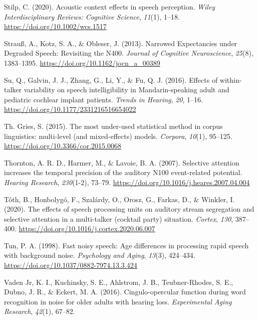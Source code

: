 \documentclass[a4paper, nobind]{templates/ociamthesis}
\newlength{\cslhangindent}
\newenvironment{CSLReferences}[2] %
 {%
  \setlength{\parindent}{0pt}
  \ifodd #1
  \let\oldpar\par
  \def\par{\hangindent=\cslhangindent\oldpar}
  \fi
  \setlength{\parskip}{1mm}
  \setlength{\baselineskip}{6mm}
 }%
 {}
\begin{document}
\begin{CSLReferences}{1}{0}
\leavevmode{}%
Stilp, C. (2020). {Acoustic context effects in speech perception}. \emph{Wiley Interdisciplinary Reviews: Cognitive Science}, \emph{11}(1), 1--18. \url{https://doi.org/10.1002/wcs.1517}

\leavevmode{}%
Strauß, A., Kotz, S. A., \& Obleser, J. (2013). Narrowed Expectancies under Degraded Speech: Revisiting the N400. \emph{Journal of Cognitive Neuroscience}, \emph{25}(8), 1383--1395. \url{https://doi.org/10.1162/jocn_a_00389}

\leavevmode{}%
Su, Q., Galvin, J. J., Zhang, G., Li, Y., \& Fu, Q. J. (2016). {Effects of within-talker variability on speech intelligibility in Mandarin-speaking adult and pediatric cochlear implant patients}. \emph{Trends in Hearing}, \emph{20}, 1--16. \url{https://doi.org/10.1177/2331216516654022}

\leavevmode{}%
Th. Gries, S. (2015). {The most under-used statistical method in corpus linguistics: multi-level (and mixed-effects) models}. \emph{Corpora}, \emph{10}(1), 95--125. \url{https://doi.org/10.3366/cor.2015.0068}

\leavevmode{}%
Thornton, A. R. D., Harmer, M., \& Lavoie, B. A. (2007). {Selective attention increases the temporal precision of the auditory N100 event-related potential}. \emph{Hearing Research}, \emph{230}(1-2), 73--79. \url{https://doi.org/10.1016/j.heares.2007.04.004}

\leavevmode{}%
Tóth, B., Honbolygó, F., Szalárdy, O., Orosz, G., Farkas, D., \& Winkler, I. (2020). {The effects of speech processing units on auditory stream segregation and selective attention in a multi-talker (cocktail party) situation}. \emph{Cortex}, \emph{130}, 387--400. \url{https://doi.org/10.1016/j.cortex.2020.06.007}

\leavevmode{}%
Tun, P. A. (1998). {Fast noisy speech: Age differences in processing rapid speech with background noise}. \emph{Psychology and Aging}, \emph{13}(3), 424--434. \url{https://doi.org/10.1037/0882-7974.13.3.424}

\leavevmode{}%
Vaden Jr, K. I., Kuchinsky, S. E., Ahlstrom, J. B., Teubner-Rhodes, S. E., Dubno, J. R., \& Eckert, M. A. (2016). Cingulo-opercular function during word recognition in noise for older adults with hearing loss. \emph{Experimental Aging Research}, \emph{42}(1), 67--82.


\end{CSLReferences}
\end{document}
